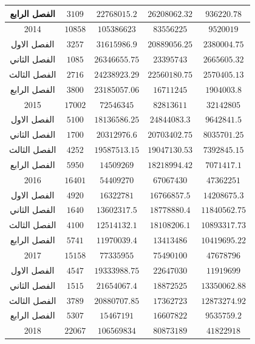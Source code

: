 \documentclass[10pt,a4paper]{report}
\begin{document}
\begin{longtable}{|c|c|c|c|c|}
	الفصل الرابع & $3109$  & $22768015.2$  & $26208062.32$ & $936220.78$   \\ \hline
	2014         & $10858$ & $105386623$   & $83556225$    & $9520019$     \\ \hline
	الفصل الاول  & $3257$  & $31615986.9$  & $20889056.25$ & $2380004.75$  \\ \hline
	الفصل الثاني & $1085$  & $26346655.75$ & $23395743$    & $2665605.32$  \\ \hline
	الفصل الثالث & $2716$  & $24238923.29$ & $22560180.75$ & $2570405.13$  \\ \hline
	الفصل الرابع & $3800$  & $23185057.06$ & $16711245$    & $1904003.8$   \\ \hline
	2015         & $17002$ & $72546345$    & $82813611$    & $32142805$    \\ \hline
	الفصل الاول  & $5100$  & $18136586.25$ & $24844083.3$  & $9642841.5$   \\ \hline
	الفصل الثاني & $1700$  & $20312976.6$  & $20703402.75$ & $8035701.25$  \\ \hline
	الفصل الثالث & $4252$  & $19587513.15$ & $19047130.53$ & $7392845.15$  \\ \hline
	الفصل الرابع & $5950$  & $14509269$    & $18218994.42$ & $7071417.1$   \\ \hline
	2016         & $16401$ & $54409270$    & $67067430$    & $47362251$    \\ \hline
	الفصل الاول  & $4920$  & $16322781$    & $16766857.5$  & $14208675.3$  \\ \hline
	الفصل الثاني & $1640$  & $13602317.5$  & $18778880.4$  & $11840562.75$ \\ \hline
	الفصل الثالث & $4100$  & $12514132.1$  & $18108206.1$  & $10893317.73$ \\ \hline
	الفصل الرابع & $5741$  & $11970039.4$  & $13413486$    & $10419695.22$ \\ \hline
	2017         & $15158$ & $77335955$    & $75490100$    & $47678796$    \\ \hline
	الفصل الاول  & $4547$  & $19333988.75$ & $22647030$    & $11919699$    \\ \hline
	الفصل الثاني & $1515$  & $21654067.4$  & $18872525$    & $13350062.88$ \\ \hline
	الفصل الثالث & $3789$  & $20880707.85$ & $17362723$    & $12873274.92$ \\ \hline
	الفصل الرابع & $5307$  & $15467191$    & $16607822$    & $9535759.2$   \\ \hline
	2018         & $22067$ & $106569834$   & $80873189$    & $41822918$    \\ \hline

\end{longtable}
\end{document}
